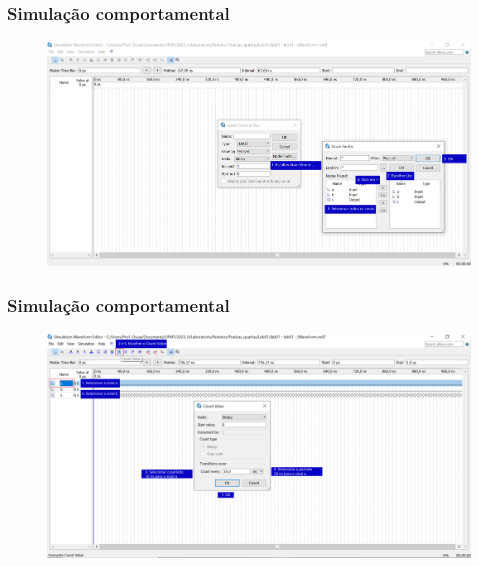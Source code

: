\documentclass{CPSPresentation}
\begin{document}
\begin{frame}
	\frametitle{Simulação comportamental}
	
	
	\begin{figure}[h]
		\centering
		\includegraphics[width=1.02\textwidth]{quartus/fig19.pdf}
	\end{figure}
	
	
\end{frame}

\begin{frame}
	\frametitle{Simulação comportamental}
	
	
	\begin{figure}[h]
		\centering
		\includegraphics[width=1.02\textwidth]{quartus/fig20.pdf}
	\end{figure}
	
	
\end{frame}
\end{document}
